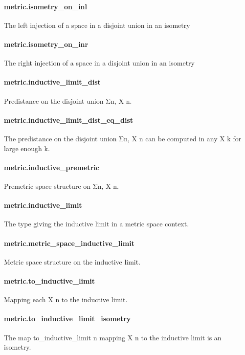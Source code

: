 \documentclass{article}
\begin{document}
\paragraph{metric.isometry\_on\_inl}
\par
The left injection of a space in a disjoint union in an isometry
\paragraph{metric.isometry\_on\_inr}
\par
The right injection of a space in a disjoint union in an isometry
\paragraph{metric.inductive\_limit\_dist}
\par
Predistance on the disjoint union Σn, X n.
\paragraph{metric.inductive\_limit\_dist\_eq\_dist}
\par
The predistance on the disjoint union Σn, X n can be computed in any X k for large enough k.
\paragraph{metric.inductive\_premetric}
\par
Premetric space structure on Σn, X n.
\paragraph{metric.inductive\_limit}
\par
The type giving the inductive limit in a metric space context.
\paragraph{metric.metric\_space\_inductive\_limit}
\par
Metric space structure on the inductive limit.
\paragraph{metric.to\_inductive\_limit}
\par
Mapping each 
\colorbox[RGB]{253,246,227}{{{{\color[RGB]{101, 123, 131} X n }}}} to the inductive limit.
\paragraph{metric.to\_inductive\_limit\_isometry}
\par
The map 
\colorbox[RGB]{253,246,227}{{{{\color[RGB]{101, 123, 131} to\_inductive\_limit n }}}} mapping 
\colorbox[RGB]{253,246,227}{{{{\color[RGB]{101, 123, 131} X n }}}} to the inductive limit is an isometry.
\end{document}
